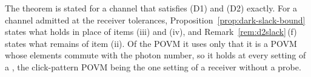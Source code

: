 
The theorem is stated for a channel that satisfies (D1) and (D2) exactly. For
a channel admitted at the receiver tolerances,
Proposition~\ref{prop:dark-slack-bound} states what holds in place of items
(iii) and (iv), and Remark~\ref{rem:d2slack}\,(f) states what remains of
item (ii). Of the POVM it uses only that it is a POVM whose elements commute
with the photon number, so it holds at every setting of a , the
click-pattern POVM being the one setting of a receiver without a probe.

